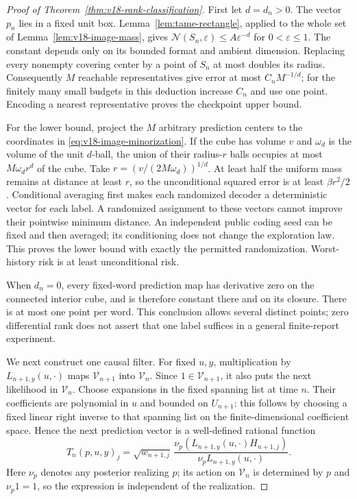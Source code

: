 \begin{proof}[Proof of Theorem~\ref{thm:v18-rank-classification}]
First let $d=d_n>0$. The vector $p_n$ lies in a fixed unit box.
Lemma~\ref{lem:tame-rectangle}, applied to the whole set of
Lemma~\ref{lem:v18-image-mass}, gives
$\mathcal N(S_n,\varepsilon)\le A\varepsilon^{-d}$ for
$0<\varepsilon\le1$. The constant depends only on its bounded format
and ambient dimension. Replacing every nonempty covering center by a
point of $S_n$ at most doubles its radius. Consequently $M$ reachable
representatives give error at most $C_nM^{-1/d}$; for the finitely many
small budgets in this deduction increase $C_n$ and use one point.
Encoding a nearest representative proves the checkpoint upper bound.

For the lower bound, project the $M$ arbitrary prediction centers to
the coordinates in \eqref{eq:v18-image-minorization}. If the cube has
volume $v$ and $\omega_d$ is the volume of the unit $d$-ball, the union
of their radius-$r$ balls occupies at most $M\omega_dr^d$ of the cube.
Take $r=(v/(2M\omega_d))^{1/d}$. At least half the uniform mass remains
at distance at least $r$, so the unconditional squared error is at
least $\beta r^2/2$. Conditional averaging first makes each randomized
decoder a deterministic vector for each label. A randomized assignment
to these vectors cannot improve their pointwise minimum distance.
An independent public coding seed can be fixed and then averaged;
its conditioning does not change the exploration law. This proves the
lower bound with exactly the permitted randomization. Worst-history
risk is at least unconditional risk.

When $d_n=0$, every fixed-word prediction map has derivative zero on
the connected interior cube, and is therefore constant there and on
its closure. There is at most one point per word. This conclusion
allows several distinct points; zero differential rank does not assert
that one label suffices in a general finite-report experiment.

We next construct one causal filter. For fixed $u,y$, multiplication
by $L_{n+1,y}(u,\cdot)$ maps $\mathscr V_{n+1}$ into $\mathscr V_n$.
Since $1\in\mathscr V_{n+1}$, it also puts the next likelihood in
$\mathscr V_n$. Choose expansions in the fixed spanning list at time
$n$. Their coefficients are polynomial in $u$ and bounded on $U_{n+1}$:
this follows by choosing a fixed linear right inverse to that spanning
list on the finite-dimensional coefficient space. Hence the next
prediction vector is a well-defined rational function
\begin{equation}\label{eq:v18-update}
 T_n(p,u,y)_j=\sqrt{w_{n+1,j}}\,
 \frac{\nu_p(L_{n+1,y}(u,\cdot)H_{n+1,j})}
      {\nu_p L_{n+1,y}(u,\cdot)}.
\end{equation}
Here $\nu_p$ denotes any posterior realizing $p$; its action on
$\mathscr V_n$ is determined by $p$ and $\nu_p1=1$, so the expression
is independent of the realization.


\end{proof}
